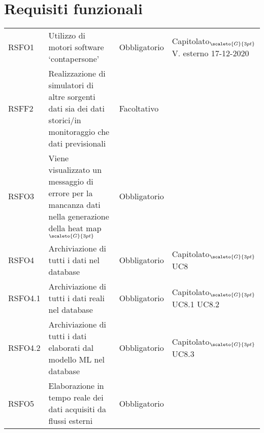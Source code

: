 \clearpage
\section{Requisiti funzionali}\label{RequisitiFunzionali}

\def\tabularxcolumn#1{m{#1}}
{

	\begin{center}
		\renewcommand{\arraystretch}{1.4}
		\begin{longtable}{|p{2.5cm}|p{4.5cm}|p{3.5cm}|p{4cm}|}
			\hline
			\rowcolor{airforceblue}
			\makecell[c]{\textbf{Codice RS}} & \makecell[c]{\textbf{Descrizione}} & \makecell[c]{\textbf{Tipo di requisito}} & \makecell[c]{\textbf{Fonte}} \\
			\hline
			\centering RSFO1 & Utilizzo di motori software ‘contapersone’  &\centering  Obbligatorio & \makecell[tc]{Capitolato$_{\scaleto{G}{3pt}}$ \\ V. esterno 17-12-2020 } \\
			\hline
			\centering RSFF2 & Realizzazione di simulatori di altre sorgenti dati sia dei dati storici/in monitoraggio che dati previsionali & \centering Facoltativo & \makecell[tc]{Capitolato$_{\scaleto{G}{3pt}}$ } \\
			\hline
			\centering RSFO3  & Viene visualizzato un messaggio di errore per la mancanza dati nella generazione della heat map$_{\scaleto{G}{3pt}}$  &\centering  Obbligatorio & \makecell[tc]{UC2}  \\
			\hline
			\centering RSFO4 & Archiviazione di tutti i dati nel database & \centering Obbligatorio & \makecell[tc]{Capitolato$_{\scaleto{G}{3pt}}$ \\ UC8}  \\
			\hline
			\centering RSFO4.1 & Archiviazione di tutti i dati reali nel database & \centering Obbligatorio & \makecell[tc]{Capitolato$_{\scaleto{G}{3pt}}$ \\ UC8.1 \\ UC8.2}  \\
			\hline
			\centering RSFO4.2 & Archiviazione di tutti i dati elaborati dal modello ML nel database & \centering Obbligatorio & \makecell[tc]{Capitolato$_{\scaleto{G}{3pt}}$ \\ UC8.3}  \\
			\hline
			\centering RSFO5 & Elaborazione in tempo reale dei dati acquisiti da flussi esterni &\centering  Obbligatorio & \makecell[tc]{Capitolato$_{\scaleto{G}{3pt}}$}  \\

\end{longtable}
\end{center}}
